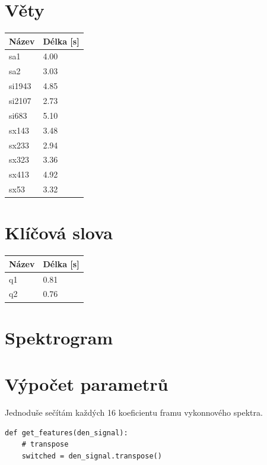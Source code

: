 \documentclass[10pt, a4paper]{article}
\begin{document}
\begin{flushleft}

\section{Věty}
	\begin{tabular}{l l}
		Název	&  Délka [s]\\ \hline
		sa1 & 4.00\\
    	sa2 & 3.03\\
    	si1943 & 4.85\\
    	si2107 &  2.73\\
    	si683 & 5.10\\
    	sx143 & 3.48\\
    	sx233 & 2.94\\
    	sx323 & 3.36\\
    	sx413 & 4.92\\
    	sx53 & 3.32\\
	\end{tabular}

\section{Klíčová slova}
	\begin{tabular}{l l}
		Název	&  Délka [s]\\ \hline
		q1 & 0.81\\
    	q2 & 0.76\\
	\end{tabular}

\section{Spektrogram}

\begin{figure}[h]
\end{figure}

\medskip
\section{Výpočet parametrů}

Jednoduše sečítám každých 16 koeficientu framu vykonnového spektra.
\begin{lstlisting}
def get_features(den_signal):
    # transpose
    switched = den_signal.transpose()


\end{lstlisting}
\end{flushleft}
\end{document}
